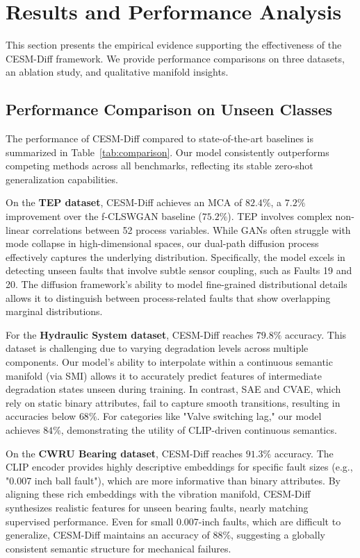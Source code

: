 \section{Results and Performance Analysis}
\label{sec:results}

This section presents the empirical evidence supporting the effectiveness of the CESM-Diff framework. We provide performance comparisons on three datasets, an ablation study, and qualitative manifold insights.

\subsection{Performance Comparison on Unseen Classes}
The performance of CESM-Diff compared to state-of-the-art baselines is summarized in Table~\ref{tab:comparison}. Our model consistently outperforms competing methods across all benchmarks, reflecting its stable zero-shot generalization capabilities.

On the \textbf{TEP dataset}, CESM-Diff achieves an MCA of $82.4\%$, a $7.2\%$ improvement over the f-CLSWGAN baseline ($75.2\%$). TEP involves complex non-linear correlations between 52 process variables. While GANs often struggle with mode collapse in high-dimensional spaces, our dual-path diffusion process effectively captures the underlying distribution. Specifically, the model excels in detecting unseen faults that involve subtle sensor coupling, such as Faults 19 and 20. The diffusion framework's ability to model fine-grained distributional details allows it to distinguish between process-related faults that show overlapping marginal distributions.

For the \textbf{Hydraulic System dataset}, CESM-Diff reaches $79.8\%$ accuracy. This dataset is challenging due to varying degradation levels across multiple components. Our model's ability to interpolate within a continuous semantic manifold (via SMI) allows it to accurately predict features of intermediate degradation states unseen during training. In contrast, SAE and CVAE, which rely on static binary attributes, fail to capture smooth transitions, resulting in accuracies below $68\%$. For categories like "Valve switching lag," our model achieves $84\%$, demonstrating the utility of CLIP-driven continuous semantics.

On the \textbf{CWRU Bearing dataset}, CESM-Diff reaches $91.3\%$ accuracy. The CLIP encoder provides highly descriptive embeddings for specific fault sizes (e.g., "0.007 inch ball fault"), which are more informative than binary attributes. By aligning these rich embeddings with the vibration manifold, CESM-Diff synthesizes realistic features for unseen bearing faults, nearly matching supervised performance. Even for small 0.007-inch faults, which are difficult to generalize, CESM-Diff maintains an accuracy of $88\%$, suggesting a globally consistent semantic structure for mechanical failures.

